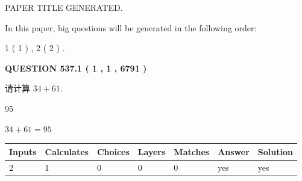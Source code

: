 \documentclass{ctexart}
\begin{document}
   
\vspace{0.2in}
   
   
   
   
   
   
   
   
 \vspace{0.2in}
 
 
 
 
   
   
 PAPER TITLE GENERATED.
   
   
   
\vspace{0.2in}
   
In this paper, big questions will be generated in the following order: 
   
   
   1 ( 1 )
 ,
   2 ( 2 )
 .
  
\vspace{0.2in}
  
{\textbf{\Large{QUESTION
537.1 
 ( 1 , 1 , 6791 )
}}}
  
  
 
请计算 $ %
34 +  %
61 $.
 
 
 
\noindent{}
 
 

95
 
 
\noindent{}
 
 

 
 
 
\noindent{}
 
 

$ %
34 +  %
61=   %
95$
 
 
\noindent{}
 
 

 
   
   
   
   
\noindent\begin{tabular}{|l|l|l|l|l|l|l|}
 \hline
Inputs & Calculates & Choices & Layers & Matches & Answer & Solution \\ \hline
 2  & 
 1  & 
 0
  & 
 0  & 
 0  & 
  yes & 
  yes 
  \\ \hline
 \end{tabular}
   
\end{document}
